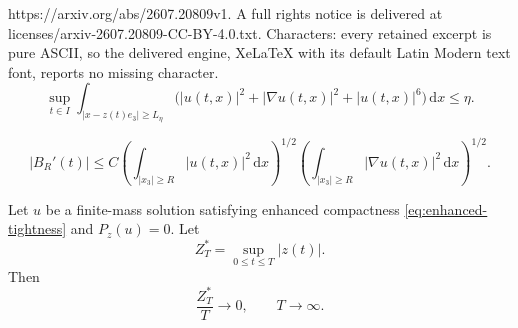 \documentclass[10pt,a4paper]{amsart}
\newcommand{\dd}{\,\mathrm d}
\newcommand{\ez}{e_3}
\newcommand{\na}{\nabla}
\begin{document}
https://arxiv.org/abs/2607.20809v1. A full rights notice is delivered at licenses/arxiv-2607.20809-CC-BY-4.0.txt. Characters: every retained excerpt is pure ASCII, so the delivered engine, XeLaTeX with its default Latin Modern text font, reports no missing character.
\begin{equation}\label{eq:enhanced-tightness}
  \sup_{t\in I}\int_{|x-z(t)\ez|\ge L_\eta}
  \bigl(|u(t,x)|^2+|\na u(t,x)|^2+|u(t,x)|^6\bigr)\dd x\le\eta.
\end{equation}

\begin{equation}\label{eq:BR-prime-tail}
  |B_R'(t)|\le C
  \left(\int_{|x_3|\ge R}|u(t,x)|^2\dd x\right)^{1/2}
  \left(\int_{|x_3|\ge R}|\na u(t,x)|^2\dd x\right)^{1/2}.
\end{equation}

\begin{lemma}\label{lem:sublinear-drift}
Let $u$ be a finite-mass solution satisfying enhanced compactness \eqref{eq:enhanced-tightness} and $P_z(u)=0$.  Let
\[
  Z_T^*=\sup_{0\le t\le T}|z(t)|.
\]
Then
\begin{equation}\label{eq:sublinear-drift}
  \frac{Z_T^*}{T}\to0,
  \qquad T\to\infty.
\end{equation}
\end{lemma}
\end{document}
